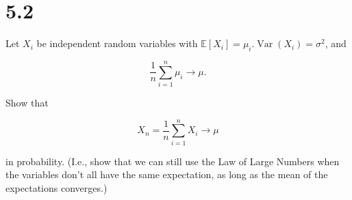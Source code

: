 \documentclass{article}%
\begin{document}
\section{5.2} Let $X_i$ be independent random variables with $\mathbb{E}\left[X_i\right]=\mu_i . \operatorname{Var}\left(X_i\right)=\sigma^2$, and

$$
\frac{1}{n} \sum_{i=1}^n \mu_i \longrightarrow \mu .
$$


Show that

$$
X_n=\frac{1}{n} \sum_{i=1}^n X_i \longrightarrow \mu
$$

in probability. (I.e., show that we can still use the Law of Large Numbers when the variables don't all have the same expectation, as long as the mean of the expectations converges.)







%
%
\end{document}
